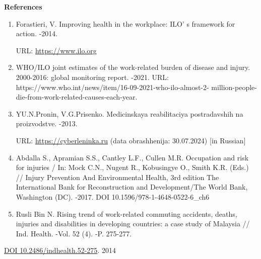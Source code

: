 \begin{center}

{\bfseries References}
\end{center}

\begin{references}

\begin{enumerate}
\def\labelenumi{\arabic{enumi}.}
\item
  Forastieri, V. Improving health in the workplace:
  ILO' s framework for action. -2014. 
  
  URL:
  \href{https://www.ilo.org/publications/improving-health-workplace-ilos-framework-action}{https://www.ilo.org}
\item
  WHO/ILO joint estimates of the work-related burden of disease and
  injury. 2000-2016: global monitoring report. -2021. URL:
  https://www.who.int/news/item/16-09-2021-who-ilo-almost-2-
  million-people-die-from-work-related-causes-each-year.
\item
  YU.N.Pronin, V.G.Prisenko. Medicinskaya reabilitaciya postradavshih na
  proizvodstve. -2013. 
  
  URL:
  \href{https://cyberleninka.ru/article/n/meditsinskaya-reabilitatsiya-postra-davshih-na-proizvodstve/viewer}{https://cyberleninka.ru}
  (data obrashhenija: 30.07.2024) {[}in Russian{]}
\item
  Abdalla S., Apramian S.S., Cantley L.F., Cullen M.R. Occupation and
  risk for injuries / In: Mock C.N., Nugent R., Kobusingye O., Smith
  K.R. (Eds.) // Injury Prevention And Environmental Health, 3rd edition
  The International Bank for Reconstruction and Development/The World
  Bank, Washington (DC). -2017. DOI 10.1596/978-1-4648-0522-6\_ch6
\item
  Rusli Bin N. Rising trend of work-related commuting accidents, deaths,
  injuries and disabilities in developing countries: a case study of
  Malaysia // Ind. Health. -Vol. 52 (4). -P. 275-277.
\end{enumerate}

\href{https://doi.org/10.2486/indhealth.52-275}{DOI
10.2486/indhealth.52-275}. 2014


\end{references}
